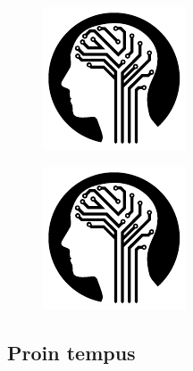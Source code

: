 			\begin{figure}
				\centering
				\begin{minipage}{.5\textwidth}
					\centering
					\includegraphics[page=1,width=0.7\linewidth]{figures/test.pdf}
					\label{fig:Test2}
				\end{minipage}%
				\begin{minipage}{.5\textwidth}
					\centering
					\includegraphics[page=1,width=0.7\linewidth]{figures/test.pdf}
					\label{fig:Test3}
				\end{minipage}
			\end{figure}
						
		\subsection{Proin tempus}
		
